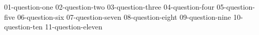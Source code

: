 \documentclass[paper=a4, DIV=12, fontsize=12pt, parskip=full]{scrartcl}
\begin{document}
\maketitle

{01-question-one}
{02-question-two}
{03-question-three}
{04-question-four}
{05-question-five}
{06-question-six}
{07-question-seven}
{08-question-eight}
{09-question-nine}
{10-question-ten}
{11-question-eleven}
\end{document}
